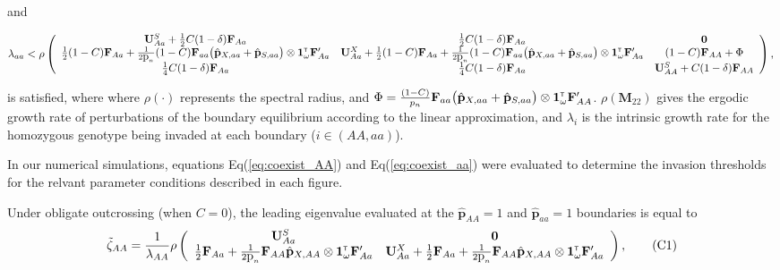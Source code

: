 \documentclass[11pt]{article}
\newcommand\numberthis{\addtocounter{equation}{1}\tag{\theequation}}
\def\mbf#1{\mathbf{#1}}
\newcommand{\tr}{{\mbox{\tiny \sf T}}}
\begin{document}
\begin{landscape}
{\noindent and 
\begin{linenomath*}
 \begin{equation} \label{eq:coexist_aa}
	\lambda_{aa} < 
			\rho\left(\begin{array}{ccc}
\mathbf{U}^S_{Aa} +\frac{1}{2} C (1 - \delta) \mbf{F}_{Aa} & \frac{1}{2} C (1 - \delta) \mbf{F}_{Aa}  & \mbf{0} \\
 \frac{1}{2} (1 - C) \mbf{F}_{Aa}+\frac{1}{2  \mbox{p}_{n}} (1 - C)\mbf{F}_{aa} \big(\hat{\mbf{p}}_{X,aa}+ \hat{\mbf{p}}_{S,aa}  \big) \otimes \mathbf{1}^\tr_{\omega} \mathbf{F}_{Aa}^\prime &\mathbf{U}^X_{Aa} + \frac{1}{2} (1 - C) \mbf{F}_{Aa} +\frac{1}{2  \mbox{p}_{n}} (1 - C)\mbf{F}_{aa} \big(\hat{\mbf{p}}_{X,aa}+ \hat{\mbf{p}}_{S,aa}  \big) \otimes \mathbf{1}^\tr_{\omega} \mathbf{F}_{Aa}^\prime & (1-C)\mbf{F}_{AA} + \Phi\\
  \frac{1}{4} C (1 - \delta) \mbf{F}_{Aa} & \frac{1}{4} C (1 - \delta) \mbf{F}_{Aa}  &\mathbf{U}^S_{AA} + C (1 - \delta) \mbf{F}_{AA}  \\ 
			\end{array} \right), \\ 
\end{equation} 
\end{linenomath*}
 }

\noindent is satisfied, where where $\rho(\cdot)$ represents the spectral radius, and $\Phi = \frac{(1 - C)}{p_{n}} \mbf{F}_{aa} \big(\hat{\mbf{p}}_{X,aa}+ \hat{\mbf{p}}_{S,aa}  \big) \otimes \mathbf{1}^\tr_{\omega} \mathbf{F}_{AA}^\prime$. $\rho(\mbf{M}_{22})$ gives the ergodic growth rate of perturbations of the boundary equilibrium according to the linear approximation, and $\lambda_i$ is the intrinsic growth rate for the homozygous genotype being invaded at each boundary ($i \in (AA,aa)$). 

In our numerical simulations, equations Eq(\ref{eq:coexist_AA}) and Eq(\ref{eq:coexist_aa}) were evaluated to determine the invasion thresholds for the relvant parameter conditions described in each figure.
\end{landscape}

Under obligate outcrossing (when $C=0$), the leading eigenvalue evaluated at the $\hat{\mbf{p}}_{AA} = 1$ and $\hat{\mbf{p}}_{aa} = 1$ boundaries is equal to
\begin{align*} \label{eq:eigAAOut}
	\tilde{\zeta}_{AA} = 
		\frac{1}{\lambda_{AA}}\rho\left(\begin{array}{cc}
\mathbf{U}^S_{Aa}  & \mathbf{0} \\
 \frac{1}{2} \mbf{F}_{Aa}+\frac{1}{2\mbox{p}_{n}}\mbf{F}_{AA} \hat{\mbf{p}}_{X,AA} \otimes \mathbf{1}^\tr_{\omega} \mathbf{F}_{Aa}^\prime &\mathbf{U}^X_{Aa} + \frac{1}{2} \mbf{F}_{Aa} +\frac{1}{2\mbox{p}_{n}} \mbf{F}_{AA} \hat{\mbf{p}}_{X,AA} \otimes \mathbf{1}^\tr_{\omega} \mathbf{F}_{Aa}^\prime
			\end{array} \right), \numberthis
\end{align*}
\end{document}
